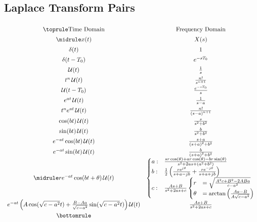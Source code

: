 \subsection{Laplace Transform Pairs}\label{subsec:Laplace_Transform_Pairs}
\begin{center}
  \begin{equation*}
    \renewcommand{\arraystretch}{1.4}
    \begin{array}[h!tbp]{cc}
      \toprule
      \text{Time Domain} & \text{Frequency Domain} \\
      \midrule
      x(t) & X(s) \\
      \delta(t) & 1 \\
      \delta(t-T_{0}) & e^{-sT_{0}} \\
      \UnitStep(t) & \frac{1}{s} \\
      t^{n} \UnitStep(t) & \frac{n!}{s^{n+1}} \\
      \UnitStep(t-T_{0}) & \frac{e^{-sT_{0}}}{s} \\
      e^{at} \UnitStep(t) & \frac{1}{s-a} \\
      t^{n} e^{at} \UnitStep(t) & \frac{n!}{{(s-a)}^{n+1}} \\
      \cos(bt) \UnitStep(t) & \frac{s}{s^{2} + b^{2}} \\
      \sin(bt) \UnitStep(t) & \frac{b}{s^{2} + b^{2}} \\
      e^{-at} \cos(bt) \UnitStep(t) & \frac{s+a}{{(s+a)}^{2} + b^{2}} \\
      e^{-at} \sin(bt) \UnitStep(t) & \frac{b}{{(s+a)}^{2} + b^{2}} \\
      \midrule
      r e^{-at} \cos(bt + \theta) \UnitStep(t) &
                                                 \begin{cases}
                                                   a :& \frac{sr \cos(\theta) + ar \cos(\theta) - br \sin(\theta)}{s^{2} + 2as + (a^{2} + b^{2})} \\
                                                   b :& \frac{1}{2} \left( \frac{r e^{j \theta}}{s+a-jb} + \frac{r e^{-j \theta}}{s+a+jb} \right) \\
                                                   c :& \frac{As+B}{s^{2} + 2as + c}
                                                   \begin{cases}
                                                     r &= \sqrt{\frac{A^{2}c + B^{2} - 2ABa}{c-a^{2}}} \\
                                                     \theta &= \arctan \left( \frac{Aa - B}{A \sqrt{c-a^{2}}} \right) \\
                                                   \end{cases}
                                                 \end{cases} \\
      e^{-at} \left( A \cos(\sqrt{c-a^{2}}t) + \frac{B-Aa}{\sqrt{c-a^{2}}} \sin(\sqrt{c-a^{2}}t) \right) \UnitStep(t) & \frac{As + B}{s^{2} + 2as + c} \\
      \bottomrule
    \end{array}
  \end{equation*}
\end{center}

